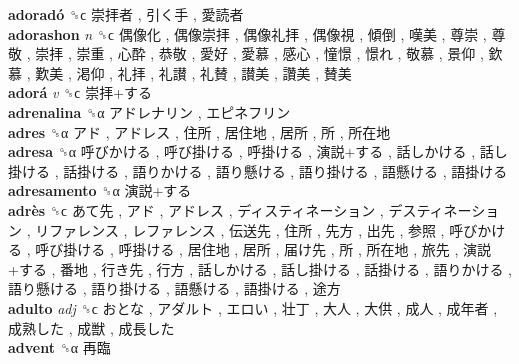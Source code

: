 \textbf{adoradó} ␝ϲ   崇拝者 ,  引く手 ,  愛読者   \\
\textbf{adorashon} \emph{n}  ␝ϲ   偶像化 ,  偶像崇拝 ,  偶像礼拝 ,  偶像視 ,  傾倒 ,  嘆美 ,  尊崇 ,  尊敬 ,  崇拝 ,  崇重 ,  心酔 ,  恭敬 ,  愛好 ,  愛慕 ,  感心 ,  憧憬 ,  憬れ ,  敬慕 ,  景仰 ,  欽慕 ,  歎美 ,  渇仰 ,  礼拝 ,  礼讃 ,  礼賛 ,  讃美 ,  讚美 ,  賛美   \\
\textbf{adorá} \emph{v}  ␝ϲ   崇拝+する   \\
\textbf{adrenalina} ␝α   アドレナリン ,  エピネフリン   \\
\textbf{adres} ␝α   アド ,  アドレス ,  住所 ,  居住地 ,  居所 ,  所 ,  所在地   \\
\textbf{adresa} ␝α   呼びかける ,  呼び掛ける ,  呼掛ける ,  演説+する ,  話しかける ,  話し掛ける ,  話掛ける ,  語りかける ,  語り懸ける ,  語り掛ける ,  語懸ける ,  語掛ける   \\
\textbf{adresamento} ␝α   演説+する   \\
\textbf{adrès} ␝ϲ   あて先 ,  アド ,  アドレス ,  ディスティネーション ,  デスティネーション ,  リファレンス ,  レファレンス ,  伝送先 ,  住所 ,  先方 ,  出先 ,  参照 ,  呼びかける ,  呼び掛ける ,  呼掛ける ,  居住地 ,  居所 ,  届け先 ,  所 ,  所在地 ,  旅先 ,  演説+する ,  番地 ,  行き先 ,  行方 ,  話しかける ,  話し掛ける ,  話掛ける ,  語りかける ,  語り懸ける ,  語り掛ける ,  語懸ける ,  語掛ける ,  途方   \\
\textbf{adulto} \emph{adj}  ␝ϲ   おとな ,  アダルト ,  エロい ,  壮丁 ,  大人 ,  大供 ,  成人 ,  成年者 ,  成熟した ,  成獣 ,  成長した   \\
\textbf{advent} ␝α   再臨   \\
